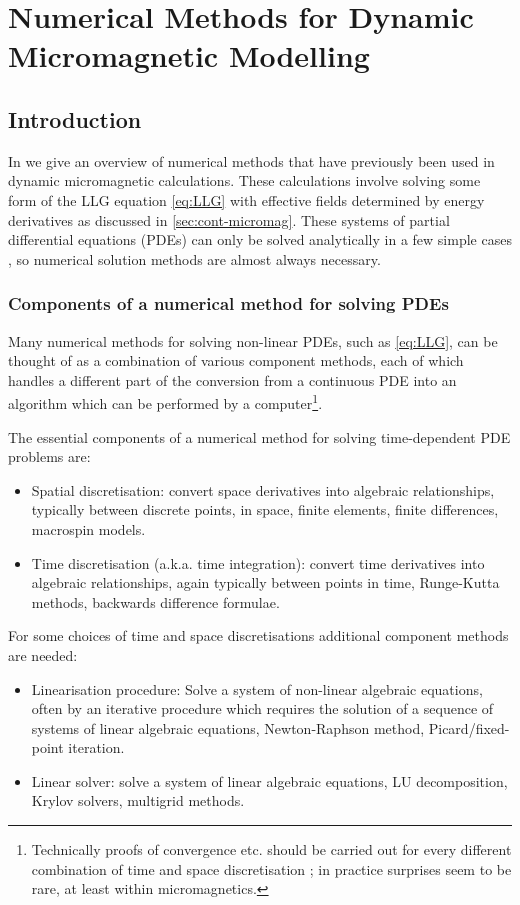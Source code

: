 \chapter{Numerical Methods for Dynamic Micromagnetic Modelling}
\label{sec:numer-meth-micr}

\section{Introduction}

In  we give an overview of numerical methods that have previously been used in dynamic micromagnetic calculations.
These calculations involve solving some form of the LLG equation \cref{eq:LLG} with effective fields determined by energy derivatives as discussed in \cref{sec:cont-micromag}.
These systems of partial differential equations (PDEs) can only be solved analytically in a few simple cases \cite{Aharoni1996}, so numerical solution methods are almost always necessary.


\subsection{Components of a numerical method for solving PDEs}

Many numerical methods for solving non-linear PDEs, such as \cref{eq:LLG}, can be thought of as a combination of various component methods, each of which handles a different part of the conversion from a continuous PDE into an algorithm which can be performed by a computer\footnote{Technically proofs of convergence etc. should be carried out for every different combination of time and space discretisation \cite[382]{Iserles2009}; in practice surprises seem to be rare, at least within micromagnetics.}.

The essential components of a numerical method for solving time-dependent PDE problems are:
\begin{itemize}
\item Spatial discretisation: convert space derivatives into algebraic relationships, typically between discrete points, in space, \eg finite elements, finite differences, macrospin models.
\item Time discretisation (a.k.a. time integration): convert time derivatives into algebraic relationships, again typically between points in time, \eg Runge-Kutta methods, backwards difference formulae.
\end{itemize}
For some choices of time and space discretisations additional component methods are needed:
\begin{itemize}
\item Linearisation procedure: Solve a system of non-linear algebraic equations, often by an iterative procedure which requires the solution of a sequence of systems of linear algebraic equations, \eg Newton-Raphson method, Picard/fixed-point iteration.
\item Linear solver: solve a system of linear algebraic equations, \eg LU decomposition, Krylov solvers, multigrid methods.
\end{itemize}

